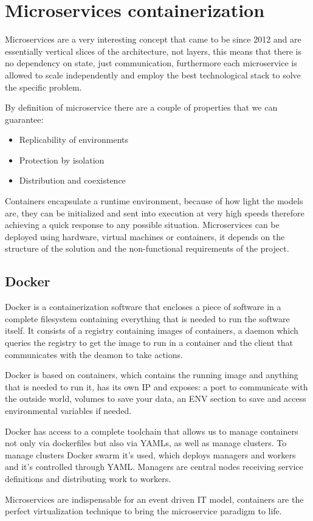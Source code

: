 \chapter{Microservices containerization}
Microservices are a very interesting concept that came to be since 2012 and are essentially vertical
slices of the architecture, not layers, this means that there is no dependency on state, just
communication, furthermore each microservice is allowed to scale independently and employ the
best technological stack to solve the specific problem.

By definition of microservice there are a couple of properties that we can guarantee:
\begin{itemize}
	\item Replicability of environments
	\item Protection by isolation
	\item Distribution and coexistence
\end{itemize}
Containers encapsulate a runtime environment, because of how light the models are, they can be
initialized and sent into execution at very high speeds therefore achieving a quick response to any
possible situation. Microservices can be deployed using hardware, virtual machines or containers,
it depends on the structure of the solution and the non-functional requirements of the project.

\section{Docker}
Docker is a containerization software that encloses a piece of software in a complete filesystem
containing everything that is needed to run the software itself. It consists of a registry
containing images of containers, a daemon which queries the registry to get the image to run in a
container and the client that communicates with the deamon to take actions.

Docker is based on containers, which contains the running image and anything that is needed to run
it, has its own IP and exposes: a port to communicate with the outside world, volumes to save your
data, an ENV section to save and access environmental variables if needed.

Docker has access to a complete toolchain that allows us to manage containers not only via
dockerfiles but also via YAMLs, as well as manage clusters. To manage clusters Docker swarm it's
used, which deploys managers and workers and it's controlled through YAML. Managers are central nodes receiving service definitions and distributing work to workers.

Microservices are indispensable for an event driven IT model, containers are the perfect
virtualization technique to bring the microservice paradigm to life.
